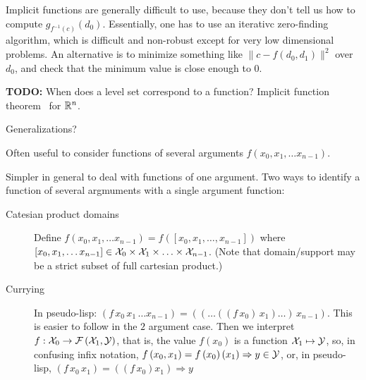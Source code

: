 Implicit functions are generally difficult to use,
because they don't tell us how to compute 
$g_{f^{-1}(c)} \left( d_0 \right)$.
Essentially, one has to use an iterativc zero-finding 
algorithm, which is difficult and non-robust except
for very low dimensional problems.
An alternative is to minimize something like
$\| c - f\left( d_0, d_1 \right) \|^2$ over $d_0$,
and check that the minimum value is close enough to $0$.

\textbf{TODO:} When does a level set correspond to a function?
Implicit function theorem~\cite[Theorem~2-2]{spivak-1965}
for $\mathbb{R}^n$. 

Generalizations?~\cite{wiki:ImplicitFunctionTheorem,
wiki:InverseFunctionTheorem}

\label{sec:Multiple-arguments}

Often useful to consider 
functions of several arguments
$f \left( x_0, x_1, \ldots x_{n-1}\right)$.

Simpler in general to deal with functions of one argument.
Two ways to identify a function of several argmuments
with a single argument function:
\begin{description}
\item[Catesian product domains]
Define $f \left( x_0, x_1, \ldots x_{n-1} \right) 
= f \left( \left[x_0, x_1, \ldots , x_{n-1} \right]\right)$
where $\left[x_0, x_1, \ldots x_{n-1} \right] \in
\mathcal{X}_0 \times \mathcal{X}_1 \times \ldots \times \mathcal{X}_{n-1}$. 
(Note that domain/support may be a strict subset of full cartesian 
product.)
\item[Currying]
In pseudo-lisp: $\left(f \, x_0 \, x_1 \, \ldots x_{n-1} \right) 
= 
\left(
\left(
\ldots 
\left( 
\left( 
f 
\, x_0 
\right) 
\, x_1
\right) 
\ldots 
\right) 
\, x_{n-1}
\right) 
$.
This is easier to follow in the $2$ argument case.
Then we interpret $f : \mathcal{X}_0 \rightarrow 
\mathcal{F}\left(\mathcal{X}_1, \mathcal{Y} \right)$,
that is, the value $f \left( x_0 \right)$ is a function 
$\mathcal{X}_1 \mapsto \mathcal{Y}$,
so, in confusing infix notation,
$f \left( x_0 , x_1 \right) = 
f \left( x_0 \right) \left( x_1 \right) \Rightarrow y \in \mathcal{Y}$,
or, in pseudo-lisp, 
$\left( f \, x_0 \, x_1 \right) = \left( \left( f \, x_0 \right) x_1 \right) \Rightarrow y$
\end{description}




